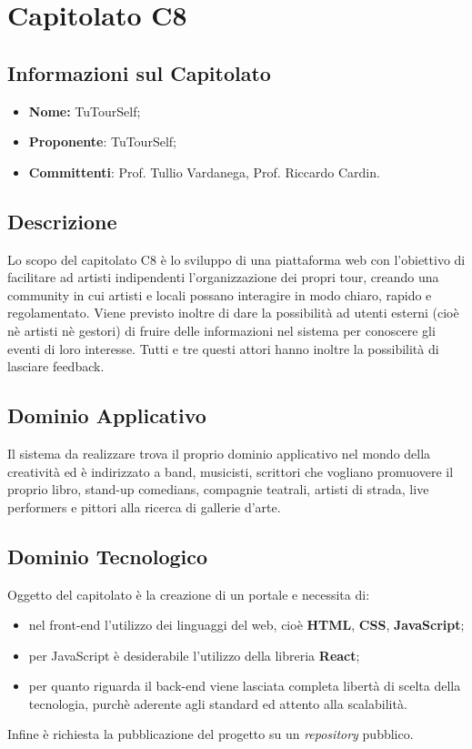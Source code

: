\section{Capitolato C8}
\subsection{Informazioni sul Capitolato}
	\begin{itemize}
		\item \textbf{Nome:}
		 TuTourSelf;
		\item \textbf{Proponente}:
		 TuTourSelf;
		\item \textbf{Committenti}:
		Prof. Tullio Vardanega, Prof. Riccardo Cardin.
	\end{itemize}

\subsection{Descrizione}
	Lo scopo del capitolato C8 è lo sviluppo di una piattaforma web con l'obiettivo di facilitare ad artisti indipendenti l'organizzazione dei propri tour, creando una community in cui artisti e locali possano interagire in modo chiaro, rapido e regolamentato. 
	Viene previsto inoltre di dare la possibilità ad utenti esterni (cioè nè artisti nè gestori) di fruire delle informazioni nel sistema per conoscere gli eventi di loro interesse. Tutti e tre questi attori hanno inoltre la possibilità di lasciare feedback.
	
\subsection{Dominio Applicativo}
	Il sistema da realizzare trova il proprio dominio applicativo nel mondo della creatività ed è indirizzato a band, musicisti, scrittori che vogliano promuovere
	il proprio libro, stand-up comedians, compagnie teatrali, artisti di strada, live
	performers e pittori alla ricerca di gallerie d’arte.

\subsection{Dominio Tecnologico}
	Oggetto del capitolato è la creazione di un portale e necessita di:
		\begin{itemize}
			\item nel front-end l'utilizzo dei linguaggi del web, cioè \textbf{HTML}, \textbf{CSS}, \textbf{JavaScript};
			\item per JavaScript è desiderabile l'utilizzo della libreria \textbf{React};
			\item per quanto riguarda il back-end viene lasciata completa libertà di scelta della tecnologia, purchè aderente agli standard ed attento alla scalabilità.
		\end{itemize}
		Infine è richiesta la pubblicazione del progetto su un \textit{repository} pubblico.

